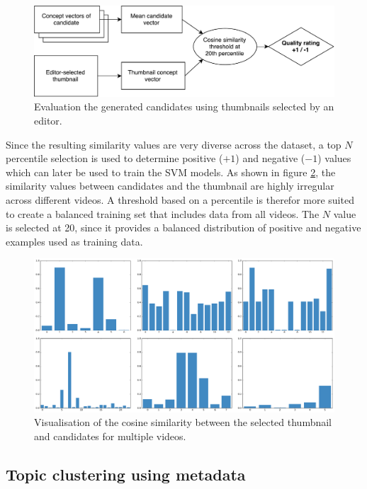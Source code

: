 \documentclass{../resources/sig-alternate-05-2015}
\begin{document}
\begin{figure}[h]
  \includegraphics[width=\linewidth]{resources/candidate-evaluation}
  \caption{Evaluation the generated candidates using thumbnails selected by an editor.}
  \label{figure: candidate evaluation scheme}
\end{figure}

Since the resulting similarity values are very diverse across the dataset, a top $N$ percentile selection is used to determine positive ($+1$) and negative ($-1$) values which can later be used to train the SVM models. As shown in figure \ref{figure: thumbnail similarity}, the similarity values between candidates and the thumbnail are highly irregular across different videos. A threshold based on a percentile is therefor more suited to create a balanced training set that includes data from all videos. The $N$ value is selected at 20, since it provides a balanced distribution of positive and negative examples used as training data.

\begin{figure}[h]
  \includegraphics[width=\linewidth]{resources/candidate-similarity.png}
  \caption{Visualisation of the cosine similarity between the selected thumbnail and candidates for multiple videos.}
  \label{figure: thumbnail similarity}
\end{figure}


\subsection{Topic clustering using metadata}
\label{topic clustering}
\end{document}
